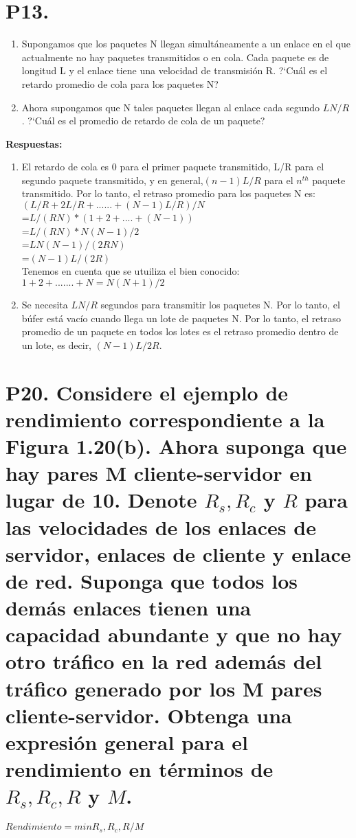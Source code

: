 \documentclass[a4paper, 11pt]{article}
\theoremstyle{definition} \theoremstyle{remark}
\begin{document}
     \renewcommand{\theenumi}{\alph{enumi}}
     \section{P13.}
     \begin{enumerate}
       \item Supongamos que los paquetes N llegan simult\'aneamente a un enlace en el que actualmente no hay paquetes transmitidos o en cola. Cada paquete es de longitud L y el enlace tiene una velocidad de transmisi\'on R. ?`Cu\'al es el retardo promedio de cola para los paquetes N?
       \item Ahora supongamos que N tales paquetes llegan al enlace cada segundo $LN/R$. ?`Cu\'al es el promedio de retardo de cola de un paquete?
     \end{enumerate}
     \textbf{Respuestas:}
     \renewcommand{\theenumi}{\alph{enumi}}
     \begin{enumerate}
       \item El retardo de cola es 0 para el primer paquete transmitido, L/R para el segundo paquete transmitido, y en general,$(n-1)L/R$ para el $n^{th}$ paquete transmitido. Por lo tanto, el retraso promedio para los paquetes N es:\\
           $(L/R+2L/R+......+(N-1)L/R)/N$\\
           =$L/(RN)*(1+2+....+(N-1))$\\
           =$L/(RN)*N(N-1)/2$\\
           =$LN(N-1)/(2RN)$\\
           =$(N-1)L/(2R)$\\
           Tenemos en cuenta que se utuiliza el bien conocido:\\
           $1+2+.......+N=N(N+1)/2$
       \item Se necesita $LN/R$ segundos para transmitir los paquetes N. Por lo tanto, el b\'ufer est\'a vac\'io cuando llega un lote de paquetes N. Por lo tanto, el retraso promedio de un paquete en todos los lotes es el retraso promedio dentro de un lote, es decir, $( N - 1)L/2R$.
     \end{enumerate}

     \section{P20. Considere el ejemplo de rendimiento correspondiente a la Figura 1.20(b). Ahora suponga que hay pares M cliente-servidor en lugar de 10. Denote $R_{s}, R_{c}$ y $R$ para las velocidades de los enlaces de servidor, enlaces de cliente y enlace de red. Suponga que todos los dem\'as enlaces tienen una capacidad abundante y que no hay otro tr\'afico en la red adem\'as del tr\'afico generado por los M pares cliente-servidor. Obtenga una expresi\'on general para el rendimiento en t\'erminos de $R_{s}, R_{c}, R$ y $M$.}
     $Rendimiento = min{R_{s}, R_{c}, R/M}$
\end{document}

